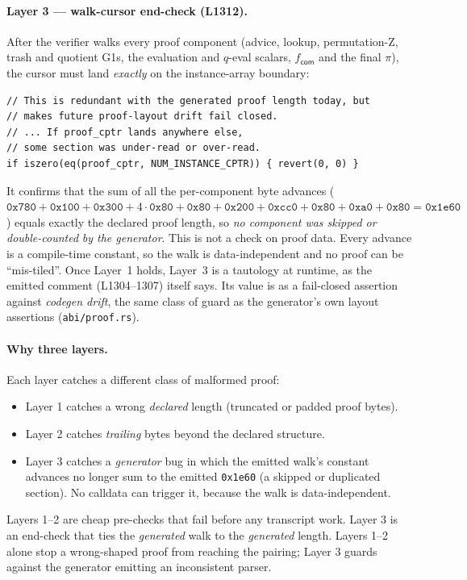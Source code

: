 \paragraph{Layer 3 --- walk-cursor end-check (L1312).} After the
verifier walks every proof component (advice, lookup, permutation-Z,
trash and quotient G1s, the evaluation and $q$-eval scalars,
$f_{\mathsf{com}}$ and the final $\pi$), the cursor
must land \emph{exactly} on the instance-array boundary:
\begin{lstlisting}[style=yul]
// This is redundant with the generated proof length today, but
// makes future proof-layout drift fail closed.
// ... If proof_cptr lands anywhere else,
// some section was under-read or over-read.
if iszero(eq(proof_cptr, NUM_INSTANCE_CPTR)) { revert(0, 0) }
\end{lstlisting}
It confirms that the sum of all the per-component byte advances
($\texttt{0x780}+\texttt{0x100}+\texttt{0x300}+4\cdot\texttt{0x80}+\texttt{0x80}+\texttt{0x200}+\texttt{0xcc0}+\texttt{0x80}+\texttt{0xa0}+\texttt{0x80}
= \texttt{0x1e60}$) equals exactly the declared proof length, so
\emph{no component was skipped or double-counted} \emph{by the
generator}.  This is not a check on proof data.
Every advance is a compile-time constant, so the walk is
data-independent and no proof can be ``mis-tiled''. Once Layer~1
holds, Layer~3 is a tautology at runtime, as the emitted comment
(L1304--1307) itself says. Its value is as a fail-closed assertion
against \emph{codegen drift}, the same class of guard as the
generator's own layout assertions (\texttt{abi/proof.rs}).

\paragraph{Why three layers.} Each layer catches a different class
of malformed proof:
\begin{itemize}[leftmargin=1.5em,itemsep=1pt]
  \item Layer 1 catches a wrong \emph{declared} length (truncated
        or padded proof bytes).
  \item Layer 2 catches \emph{trailing} bytes beyond the declared
        structure.
  \item Layer 3 catches a \emph{generator} bug in which the emitted
        walk's constant advances no longer sum to the emitted
        \texttt{0x1e60} (a skipped or duplicated section). No
        calldata can trigger it, because the walk is
        data-independent.
\end{itemize}
Layers 1--2 are cheap pre-checks that fail before any transcript
work. Layer 3 is an end-check that ties the \emph{generated} walk to
the \emph{generated} length. Layers 1--2 alone stop a wrong-shaped
proof from reaching the pairing; Layer 3 guards against the
generator emitting an inconsistent parser.

